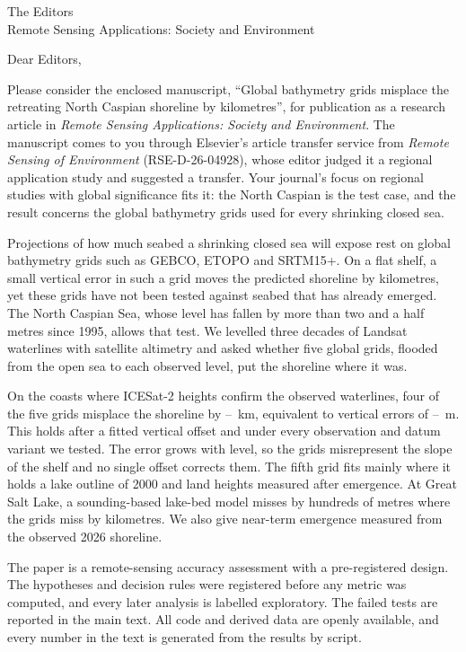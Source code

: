 \documentclass[10pt]{letter}
\begin{document}
\begin{letter}{The Editors\\Remote Sensing Applications: Society and Environment}
\opening{Dear Editors,}

Please consider the enclosed manuscript, ``Global bathymetry grids misplace the retreating North Caspian shoreline by kilometres'', for publication as a research article in \emph{Remote Sensing Applications: Society and Environment}. The manuscript comes to you through Elsevier's article transfer service from \emph{Remote Sensing of Environment} (RSE-D-26-04928), whose editor judged it a regional application study and suggested a transfer. Your journal's focus on regional studies with global significance fits it: the North Caspian is the test case, and the result concerns the global bathymetry grids used for every shrinking closed sea.

Projections of how much seabed a shrinking closed sea will expose rest on global bathymetry grids such as GEBCO, ETOPO and SRTM15+. On a flat shelf, a small vertical error in such a grid moves the predicted shoreline by kilometres, yet these grids have not been tested against seabed that has already emerged. The North Caspian Sea, whose level has fallen by more than two and a half metres since 1995, allows that test. We levelled three decades of Landsat waterlines with satellite altimetry and asked whether five global grids, flooded from the open sea to each observed level, put the shoreline where it was.

On the coasts where ICESat-2 heights confirm the observed waterlines, four of the five grids misplace the shoreline by --~km, equivalent to vertical errors of --~m. This holds after a fitted vertical offset and under every observation and datum variant we tested. The error grows with level, so the grids misrepresent the slope of the shelf and no single offset corrects them. The fifth grid fits mainly where it holds a lake outline of 2000 and land heights measured after emergence. At Great Salt Lake, a sounding-based lake-bed model misses by hundreds of metres where the grids miss by kilometres. We also give near-term emergence measured from the observed 2026 shoreline.

The paper is a remote-sensing accuracy assessment with a pre-registered design. The hypotheses and decision rules were registered before any metric was computed, and every later analysis is labelled exploratory. The failed tests are reported in the main text. All code and derived data are openly available, and every number in the text is generated from the results by script.


\end{letter}
\end{document}
